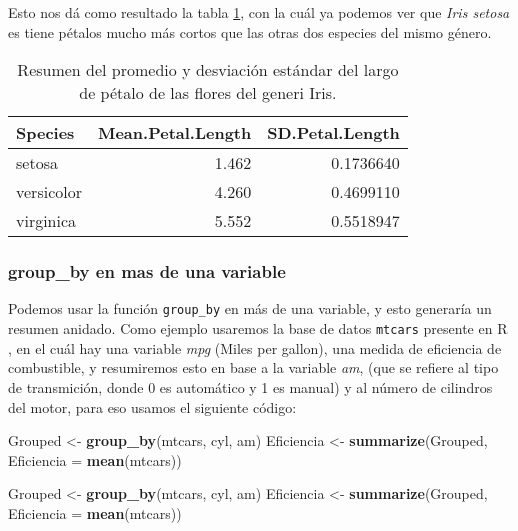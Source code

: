 \documentclass[]{book}
\newenvironment{Shaded}{\begin{snugshade}}{\end{snugshade}}
\newcommand{\DataTypeTok}[1]{\textcolor[rgb]{0.13,0.29,0.53}{#1}}
\newcommand{\KeywordTok}[1]{\textcolor[rgb]{0.13,0.29,0.53}{\textbf{#1}}}
\newcommand{\NormalTok}[1]{#1}
\newcommand{\StringTok}[1]{\textcolor[rgb]{0.31,0.60,0.02}{#1}}
\begin{document}
Esto nos dá como resultado la tabla \ref{tab:SummaryBySpecies}, con la
cuál ya podemos ver que \emph{Iris setosa} es tiene pétalos mucho más
cortos que las otras dos especies del mismo género.

\begin{table}

\caption{\label{tab:SummaryBySpecies}Resumen del promedio y desviación estándar del largo de pétalo de las flores del generi Iris.}
\centering
\begin{tabular}[t]{lrr}
\toprule
Species & Mean.Petal.Length & SD.Petal.Length\\
\midrule
setosa & 1.462 & 0.1736640\\
versicolor & 4.260 & 0.4699110\\
virginica & 5.552 & 0.5518947\\
\bottomrule
\end{tabular}
\end{table}

\hypertarget{group_by-en-mas-de-una-variable}{%
\subsubsection{group\_by en mas de una
variable}\label{group_by-en-mas-de-una-variable}}

Podemos usar la función \texttt{group\_by} en más de una variable, y
esto generaría un resumen anidado. Como ejemplo usaremos la base de
datos \texttt{mtcars} presente en R \citep{henderson1981building}, en el
cuál hay una variable \emph{mpg} (Miles per gallon), una medida de
eficiencia de combustible, y resumiremos esto en base a la variable
\emph{am}, (que se refiere al tipo de transmición, donde 0 es automático
y 1 es manual) y al número de cilindros del motor, para eso usamos el
siguiente código:

\begin{Shaded}
\begin{Highlighting}[]
\NormalTok{Grouped <-}\StringTok{ }\KeywordTok{group_by}\NormalTok{(mtcars, cyl, am)}
\NormalTok{Eficiencia <-}\StringTok{ }\KeywordTok{summarize}\NormalTok{(Grouped, }\DataTypeTok{Eficiencia =} \KeywordTok{mean}\NormalTok{(mtcars))}
\end{Highlighting}
\end{Shaded}

\begin{Shaded}
\begin{Highlighting}[]
\NormalTok{Grouped <-}\StringTok{ }\KeywordTok{group_by}\NormalTok{(mtcars, cyl, am)}
\NormalTok{Eficiencia <-}\StringTok{ }\KeywordTok{summarize}\NormalTok{(Grouped, }\DataTypeTok{Eficiencia =} \KeywordTok{mean}\NormalTok{(mtcars))}
\end{Highlighting}
\end{Shaded}
\end{document}
